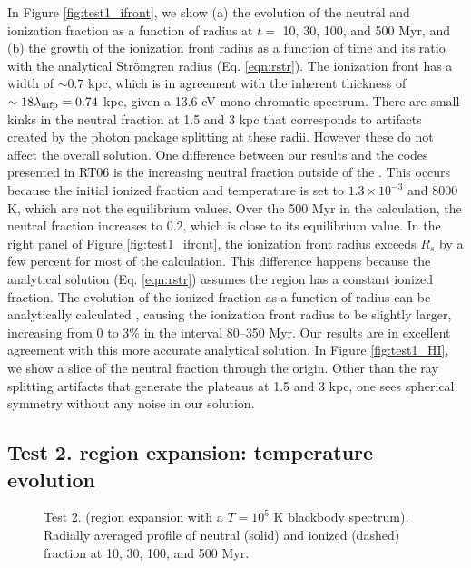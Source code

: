 \documentclass[useAMS,usenatbib,a4paper]{mn2e}
\begin{document}
In Figure \ref{fig:test1_ifront}, we show (a) the evolution of the
neutral and ionization fraction as a function of radius at $t = $ 10,
30, 100, and 500 Myr, and (b) the growth of the ionization front
radius as a function of time and its ratio with the analytical
Str\"{o}mgren radius (Eq. \ref{eqn:rstr}).  The ionization front has a
width of $\sim0.7$ kpc, which is in agreement with the inherent
thickness of $\sim18 \lambda_{\rm mfp} = 0.74$ kpc, given a 13.6 eV
mono-chromatic spectrum.  There are small kinks in the neutral
fraction at 1.5 and 3 kpc that corresponds to artifacts created by the
photon package splitting at these radii.  However these do not affect
the overall solution.  One difference between our results and the
codes presented in RT06 is the increasing neutral fraction outside of
the \hii.  This occurs because the initial ionized fraction and
temperature is set to $1.3 \times 10^{-3}$ and 8000 K, which are not
the equilibrium values.  Over the 500 Myr in the calculation, the
neutral fraction increases to 0.2, which is close to its equilibrium
value.  In the right panel of Figure \ref{fig:test1_ifront}, the
ionization front radius exceeds $R_s$ by a few percent for most of the
calculation.  This difference happens because the analytical solution
(Eq. \ref{eqn:rstr}) assumes the \hii region has a constant
ionized fraction.  The evolution of the ionized fraction as a function
of radius can be analytically calculated \citep[e.g.][]{Osterbrock89,
  Petkova09}, causing the ionization front radius to be slightly
larger, increasing from 0 to 3\% in the interval 80--350 Myr.  Our
results are in excellent agreement with this more accurate analytical
solution.  In Figure \ref{fig:test1_HI}, we show a slice of the
neutral fraction through the origin.  Other than the ray splitting
artifacts that generate the plateaus at 1.5 and 3 kpc, one sees
spherical symmetry without any noise in our solution.

\subsection{Test 2. \hii region expansion: temperature evolution}

\begin{figure}
  \caption{\label{fig:test2_1a} Test 2. (\hii region expansion with a
    $T=10^5$ K blackbody spectrum).  Radially averaged profile of
    neutral (solid) and ionized (dashed) fraction at 10, 30, 100, and
    500 Myr.}
\end{figure}
\end{document}
